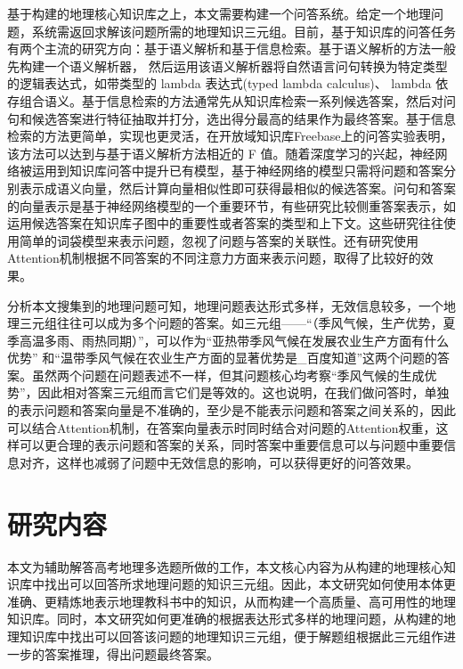 基于构建的地理核心知识库之上，本文需要构建一个问答系统。给定一个地理问题，系统需返回求解该问题所需的地理知识三元组。目前，基于知识库的问答任务有两个主流的研究方向：基于语义解析\cite{Zettlemoyer,Cai,BerantCA,Dyer}和基于信息检索\cite{Yao,Bordes1,Dong,Bordes2}。基于语义解析的方法一般先构建一个语义解析器， 然后运用该语义解析器将自然语言问句转换为特定类型的逻辑表达式，如带类型的 lambda 表达式(typed lambda calculus)、 lambda 依存组合语义\cite{Wong,BerantCA,Yih}。基于信息检索的方法通常先从知识库检索一系列候选答案，然后对问句和候选答案进行特征抽取并打分，选出得分最高的结果作为最终答案\cite{Bordes1,Kim}。基于信息检索的方法更简单，实现也更灵活，在开放域知识库Freebase上的问答实验表明，该方法可以达到与基于语义解析方法相近的 F 值\cite{Dong,Bordes2}。随着深度学习的兴起，神经网络被运用到知识库问答中提升已有模型，基于神经网络的模型只需将问题和答案分别表示成语义向量，然后计算向量相似性即可获得最相似的候选答案。问句和答案的向量表示是基于神经网络模型的一个重要环节，有些研究比较侧重答案表示，如运用候选答案在知识库子图中的重要性\cite{Bordes1}或者答案的类型和上下文\cite{Dong}。这些研究往往使用简单的词袋模型来表示问题，忽视了问题与答案的关联性\cite{Bordes1}。还有研究使用Attention机制根据不同答案的不同注意力方面来表示问题\cite{Zhang}，取得了比较好的效果。

分析本文搜集到的地理问题可知，地理问题表达形式多样，无效信息较多，一个地理三元组往往可以成为多个问题的答案。如三元组——“（季风气候，生产优势，夏季高温多雨、雨热同期）”，可以作为“亚热带季风气候在发展农业生产方面有什么优势” 和“温带季风气候在农业生产方面的显著优势是\_百度知道”这两个问题的答案。虽然两个问题在问题表述不一样，但其问题核心均考察“季风气候的生成优势”，因此相对答案三元组而言它们是等效的。这也说明，在我们做问答时，单独的表示问题和答案向量是不准确的，至少是不能表示问题和答案之间关系的，因此可以结合Attention机制，在答案向量表示时同时结合对问题的Attention权重，这样可以更合理的表示问题和答案的关系，同时答案中重要信息可以与问题中重要信息对齐，这样也减弱了问题中无效信息的影响，可以获得更好的问答效果。

\section{研究内容}
本文为辅助解答高考地理多选题所做的工作，本文核心内容为从构建的地理核心知识库中找出可以回答所求地理问题的知识三元组。因此，本文研究如何使用本体更准确、更精炼地表示地理教科书中的知识，从而构建一个高质量、高可用性的地理知识库。同时，本文研究如何更准确的根据表达形式多样的地理问题，从构建的地理知识库中找出可以回答该问题的地理知识三元组，便于解题组根据此三元组作进一步的答案推理，得出问题最终答案。

